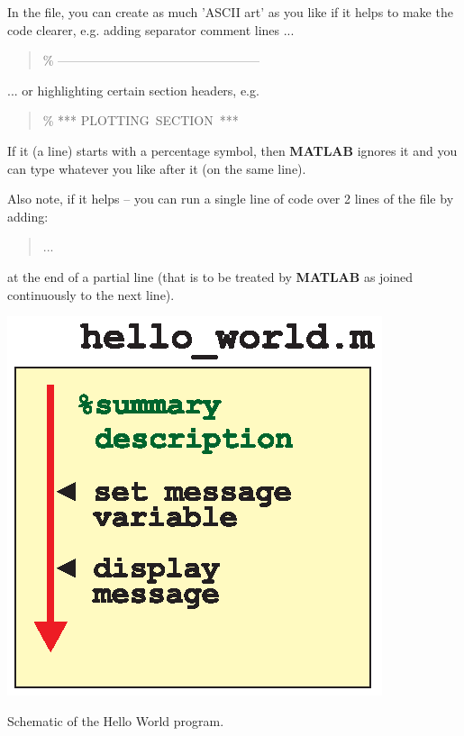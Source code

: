 \documentclass{tufte-book} %
\newenvironment{docspec}{\begin{quotation}\ttfamily\parskip0pt\parindent0pt\ignorespaces}{\end{quotation}}
\begin{document}
In the file, you can create as much 'ASCII art' as you like if it helps to make the code clearer, e.g. adding separator comment lines ...

\begin{docspec}
\textcolor[rgb]{0,0.501961,0}{\% ------------------------------------------------}
\end{docspec} 

... or highlighting certain section headers, e.g.

\begin{docspec}
\textcolor[rgb]{0,0.501961,0}{\% *** PLOTTING\ SECTION\ ***}
\end{docspec}

\noindent If it (a line) starts with a percentage symbol, then \textbf{MATLAB} ignores it and you can type whatever you like after it (on the same line).

\noindent Also note, if it helps -- you can run a single line of code over 2 lines of the file by adding:

\begin{docspec}
...
\end{docspec}

\noindent at the end of a partial line (that is to be treated by \textbf{MATLAB} as joined continuously to the next line).

\begin{marginfigure}[3.0in]
\includegraphics[width=\linewidth]{ch2-hello_world.eps}
\caption{Schematic of the Hello World program.}
\label{fig:ch2-hello_world}
\end{marginfigure}
\end{document}
